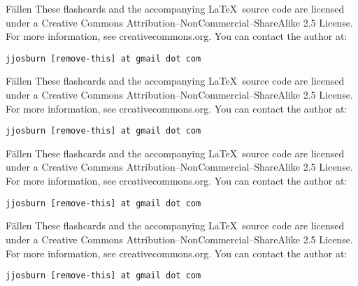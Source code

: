 \documentclass[avery5371,grid]{flashcards}
\begin{document}
\begin{flashcard}[Verb]{\Huge Fällen}
{\large These flashcards and the accompanying \LaTeX \, source code are licensed
under a Creative Commons Attribution--NonCommercial--ShareAlike 2.5 License.  
For more information, see creativecommons.org.  You can contact the author at: }
\begin{center}
\begin{small}\tt jjosburn [remove-this] at gmail dot com\end{small}
\end{center}
\end{flashcard}

\begin{flashcard}[Verb]{\Huge Fällen}
{\large These flashcards and the accompanying \LaTeX \, source code are licensed
under a Creative Commons Attribution--NonCommercial--ShareAlike 2.5 License.  
For more information, see creativecommons.org.  You can contact the author at: }
\begin{center}
\begin{small}\tt jjosburn [remove-this] at gmail dot com\end{small}
\end{center}
\end{flashcard}

\begin{flashcard}[Verb]{\Huge Fällen}
{\large These flashcards and the accompanying \LaTeX \, source code are licensed
under a Creative Commons Attribution--NonCommercial--ShareAlike 2.5 License.  
For more information, see creativecommons.org.  You can contact the author at: }
\begin{center}
\begin{small}\tt jjosburn [remove-this] at gmail dot com\end{small}
\end{center}
\end{flashcard}

\begin{flashcard}[Verb]{\Huge Fällen}
{\large These flashcards and the accompanying \LaTeX \, source code are licensed
under a Creative Commons Attribution--NonCommercial--ShareAlike 2.5 License.  
For more information, see creativecommons.org.  You can contact the author at: }
\begin{center}
\begin{small}\tt jjosburn [remove-this] at gmail dot com\end{small}
\end{center}
\end{flashcard}
\end{document}
